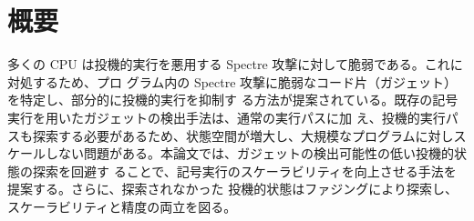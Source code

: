 \section{概要}
多くの CPU は投機的実行を悪用する Spectre 攻撃に対して脆弱である。これに対処するため、プロ
グラム内の Spectre 攻撃に脆弱なコード片（ガジェット）を特定し、部分的に投機的実行を抑制す
る方法が提案されている。既存の記号実行を用いたガジェットの検出手法は、通常の実行パスに加
え、投機的実行パスも探索する必要があるため、状態空間が増大し、大規模なプログラムに対しス
ケールしない問題がある。本論文では、ガジェットの検出可能性の低い投機的状態の探索を回避す
ることで、記号実行のスケーラビリティを向上させる手法を提案する。さらに、探索されなかった
投機的状態はファジングにより探索し、スケーラビリティと精度の両立を図る。


